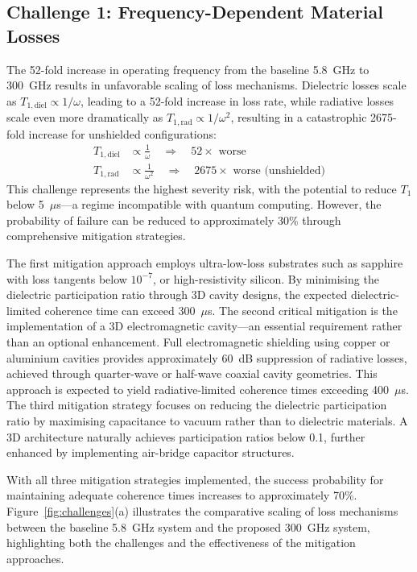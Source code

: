 \subsection{Challenge 1: Frequency-Dependent Material Losses}

The 52-fold increase in operating frequency from the baseline 5.8~GHz to 300~GHz results in unfavorable scaling of loss mechanisms. Dielectric losses scale as $T_{1,\text{diel}} \propto 1/\omega$, leading to a 52-fold increase in loss rate, while radiative losses scale even more dramatically as $T_{1,\text{rad}} \propto 1/\omega^2$, resulting in a catastrophic 2675-fold increase for unshielded configurations:
\begin{align}
T_{1,\text{diel}} &\propto \frac{1}{\omega} \quad \Rightarrow \quad 52\times \text{ worse} \\
T_{1,\text{rad}} &\propto \frac{1}{\omega^2} \quad \Rightarrow \quad 2675\times \text{ worse (unshielded)}
\end{align}
This challenge represents the highest severity risk, with the potential to reduce $T_1$ below 5~$\mu$s—a regime incompatible with quantum computing. However, the probability of failure can be reduced to approximately 30\% through comprehensive mitigation strategies.

The first mitigation approach employs ultra-low-loss substrates such as sapphire with loss tangents below $10^{-7}$, or high-resistivity silicon. By minimising the dielectric participation ratio through 3D cavity designs, the expected dielectric-limited coherence time can exceed 300~$\mu$s. The second critical mitigation is the implementation of a 3D electromagnetic cavity—an essential requirement rather than an optional enhancement. Full electromagnetic shielding using copper or aluminium cavities provides approximately 60~dB suppression of radiative losses, achieved through quarter-wave or half-wave coaxial cavity geometries. This approach is expected to yield radiative-limited coherence times exceeding 400~$\mu$s. The third mitigation strategy focuses on reducing the dielectric participation ratio by maximising capacitance to vacuum rather than to dielectric materials. A 3D architecture naturally achieves participation ratios below 0.1, further enhanced by implementing air-bridge capacitor structures.

With all three mitigation strategies implemented, the success probability for maintaining adequate coherence times increases to approximately 70\%. Figure~\ref{fig:challenges}(a) illustrates the comparative scaling of loss mechanisms between the baseline 5.8~GHz system and the proposed 300~GHz system, highlighting both the challenges and the effectiveness of the mitigation approaches.

